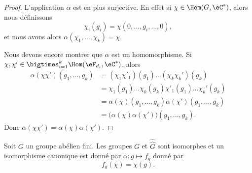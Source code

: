 \begin{proof}
	L'application \( \alpha\) est en plus surjective. En effet si \( \chi\in\Hom(G,\eC^*)\), alors nous définissons
	\begin{equation}
		\chi_i(g_i)=\chi(0,\ldots, g_i,\ldots, 0),
	\end{equation}
	et nous avons alors \( \alpha(\chi_1,\ldots, \chi_k)=\chi\).

	Nous devons encore montrer que \( \alpha\) est un homomorphisme. Si \( \chi,\chi'\in\bigtimes_{i=1}^k\Hom(\eF_{d_i},\eC^*)\), alors
	\begin{subequations}
		\begin{align}
			\alpha(\chi\chi')(g_1,\ldots, g_k) & =(\chi_1\chi'_1)(g_1)\ldots (\chi_k\chi_k')(g_k)              \\
			                                   & =\chi_1(g_1)\ldots \chi_k(g_k)\chi'_1(g_1)\ldots \chi_k'(g_k) \\
			                                   & =\alpha(\chi)(g_1,\ldots, g_k)\alpha(\chi')(g_1,\ldots, g_k)  \\
			                                   & =\big( \alpha(\chi)\alpha(\chi') \big)(g_1,\ldots, g_k).
		\end{align}
	\end{subequations}
	Donc \( \alpha(\chi\chi')=\alpha(\chi)\alpha(\chi')\).
\end{proof}

\begin{theorem}
	Soit \( G\) un groupe abélien fini. Les groupes \( G\) et \( \hat{\hat G}\) sont isomorphes et un isomorphisme canonique est donné par \( \alpha\colon g\mapsto f_g\) donné par
	\begin{equation}
		f_g(\chi)=\chi(g).
	\end{equation}
\end{theorem}

